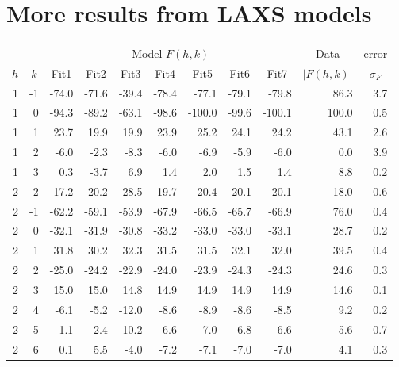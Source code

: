 \section{More results from LAXS models}
\begin{table}[htbp]
  \centering
\begin{tabular}{rrrrrrrrrrr}
\hline
& & \multicolumn{7}{c}{Model $F(h,k)$} & \multicolumn{1}{c}{Data} & \multicolumn{1}{c}{error} \\
\cline{3-9}
\multicolumn{1}{c}{$h$} & \multicolumn{1}{c}{$k$} & \multicolumn{1}{c}{Fit1} & \multicolumn{1}{c}{Fit2} & \multicolumn{1}{c}{Fit3} & \multicolumn{1}{c}{Fit4} & \multicolumn{1}{c}{Fit5} & \multicolumn{1}{c}{Fit6} & \multicolumn{1}{c}{Fit7} & \multicolumn{1}{c}{$|F(h,k)|$} & \multicolumn{1}{c}{$\sigma_F$} \\ 
\hline
1 & -1 & -74.0 & -71.6 & -39.4 & -78.4 & -77.1 & -79.1 & -79.8 & 86.3 & 3.7 \\ 
1 & 0 & -94.3 & -89.2 & -63.1 & -98.6 & -100.0 & -99.6 & -100.1 & 100.0 & 0.5 \\ 
1 & 1 & 23.7 & 19.9 & 19.9 & 23.9 & 25.2 & 24.1 & 24.2 & 43.1 & 2.6 \\ 
1 & 2 & -6.0 & -2.3 & -8.3 & -6.0 & -6.9 & -5.9 & -6.0 & 0.0 & 3.9 \\ 
1 & 3 & 0.3 & -3.7 & 6.9 & 1.4 & 2.0 & 1.5 & 1.4 & 8.8 & 0.2 \\ 
2 & -2 & -17.2 & -20.2 & -28.5 & -19.7 & -20.4 & -20.1 & -20.1 & 18.0 & 0.6 \\ 
2 & -1 & -62.2 & -59.1 & -53.9 & -67.9 & -66.5 & -65.7 & -66.9 & 76.0 & 0.4 \\ 
2 & 0 & -32.1 & -31.9 & -30.8 & -33.2 & -33.0 & -33.0 & -33.1 & 28.7 & 0.2 \\ 
2 & 1 & 31.8 & 30.2 & 32.3 & 31.5 & 31.5 & 32.1 & 32.0 & 39.5 & 0.4 \\ 
2 & 2 & -25.0 & -24.2 & -22.9 & -24.0 & -23.9 & -24.3 & -24.3 & 24.6 & 0.3 \\ 
2 & 3 & 15.0 & 15.0 & 14.8 & 14.9 & 14.9 & 14.9 & 14.9 & 14.6 & 0.1 \\ 
2 & 4 & -6.1 & -5.2 & -12.0 & -8.6 & -8.9 & -8.6 & -8.5 & 9.2 & 0.2 \\ 
2 & 5 & 1.1 & -2.4 & 10.2 & 6.6 & 7.0 & 6.8 & 6.6 & 5.6 & 0.7 \\ 
2 & 6 & 0.1 & 5.5 & -4.0 & -7.2 & -7.1 & -7.0 & -7.0 & 4.1 & 0.3 \\ 

\end{tabular}
\end{table}
